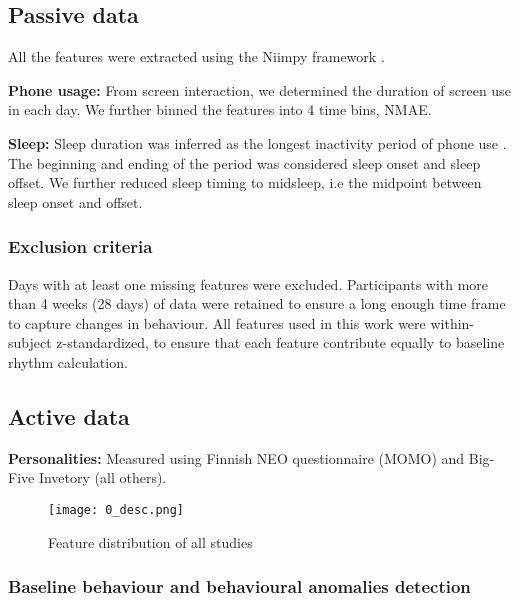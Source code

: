 \documentclass[pdflatex,sn-vancouver,Numbered]{bst/sn-jnl}%
\theoremstyle{thmstyleone}%
\theoremstyle{thmstyletwo}%
\theoremstyle{thmstylethree}%
\begin{document}
\subsection*{Passive data}

All the features were extracted using the Niimpy framework \cite{ikaheimonen2023niimpy}. 

\textbf{Phone usage:} From screen interaction, we determined the duration of screen use in each day. We further binned the features into 4 time bins, NMAE. 

\textbf{Sleep:} Sleep duration was inferred as the longest inactivity period of phone use \cite{aledavood2022quantifying}. The beginning and ending of the period was considered sleep onset and sleep offset. We further reduced sleep timing to midsleep, i.e the midpoint between sleep onset and offset.

\subsubsection*{Exclusion criteria} Days with at least one missing features were excluded. Participants with more than 4 weeks (28 days) of data were retained to ensure a long enough time frame to capture changes in behaviour. All features used in this work were within-subject z-standardized, to ensure that each feature contribute equally to baseline rhythm calculation.

%

\subsection*{Active data}

\textbf{Personalities: } Measured using Finnish NEO questionnaire (MOMO) and Big-Five Invetory (all others).

\begin{figure}
    \centering
    \texttt{[image: 0\_desc.png]}
    \caption{Feature distribution of all studies}
    \label{fig:enter-label}
\end{figure}



\subsubsection*{Baseline behaviour and behavioural anomalies detection}\label{sec2.2.1}
\end{document}
